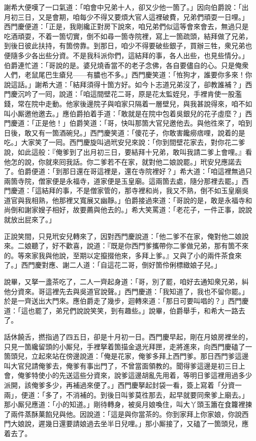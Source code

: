 謝希大便嘆了一口氣道：「咱會中兄弟十人，卻又少他一箇了。」因向伯爵說：「出月初三日，又是會期，咱每少不得又要煩大官人這裡破費，兄弟們頑耍一日哩。」西門慶便道：「正是，我剛纔正對房下說來，咱兄弟們似這等會來會去，無過只是吃酒頑耍，不着一箇切實，倒不如尋一箇寺院裡，寫上一箇疏頭，結拜做了兄弟，到後日彼此扶持，有箇傍靠。到那日，咱少不得要破些銀子，買辦三牲，衆兄弟也便隨多少各出些分資。不是我科派你們，這結拜的事，各人出些，也見些情分。」伯爵連忙道：「哥說的是。婆兒燒香當不的老子念佛，各自要儘自的心。只是俺衆人們，老鼠尾巴生瘡兒——有膿也不多。」西門慶笑道：「恠狗才，誰要你多來！你說這話。」謝希大道：「結拜須得十箇方好。如今卜志道兄弟沒了，卻教誰補？」西門慶沉吟了一囘，說道：「咱這間壁花二哥，原是花太監姪兒，手裡肯使一股濫錢，常在院中走動。他家後邊院子與咱家只隔着一層壁兒，{}與我甚說得來，咱不如叫小厮邀他邀去。」應伯爵拍着手道：「敢就是在院中包着吳銀兒的花子虛麼？」西門慶道：「正是他！」伯爵笑道：「哥，快叫那箇大官兒邀他去。{}與他徃來了，咱到日後，敢又有一箇酒碗兒。」西門慶笑道：「傻花子，你敢害饞癆痞哩，說着的是吃。」大家笑了一囘。西門慶旋叫過玳安兒來說：「你到間壁花家去，對你花二爹說，如此這般：『俺爹到了出月初三日，要結拜十兄弟，敢叫我請二爹上會哩。』看他怎的說，你就來囘我話。你二爹若不在家，就對他二娘說罷。」玳安兒應諾去了。伯爵便道：「到那日還在哥這裡是，還在寺院裡好？」希大道：「咱這裡無過只兩箇寺院，僧家便是永福寺，道家便是玉皇廟。{}這兩箇去處，隨分那裡去罷。」西門慶道：「這結拜的事，不是僧家管的，那寺裡和尚，我又不熟，倒不如玉皇廟吳道官與我相熟，他那裡又寬展又幽靜。」伯爵接過來道：「哥說的是，敢是永福寺和尚倒和謝家嫂子相好，故要薦與他去的。」希大笑罵道：「老花子，一件正事，說說就放出屁來了。」

正說笑間，只見玳安兒轉來了，因對西門慶說道：「他二爹不在家，俺對他二娘說來。二娘聽了，好不歡喜，{}說道：『既是你西門爹攜帶你二爹做兄弟，那有箇不來的。{}等來家我與他說，至期以定攛掇他來，多拜上爹。』又與了小的兩件茶食來了。」{}西門慶對應、謝二人道：「自這花二哥，倒好箇伶俐標緻娘子兒。」{}

說畢，又拏一盞茶吃了，二人一齊起身道：「哥，別了罷，咱好去通知衆兄弟，糾他分資來。哥這裡先去與吳道官說聲。」西門慶道：「我知道了，我也不留你罷。」於是一齊送出大門來。應伯爵走了幾步，迴轉來道：「那日可要叫唱的？」西門慶道：「這也罷了，弟兄們說說笑笑，到有趣些。」說畢，伯爵舉手，和希大一路去了。

話休饒舌，撚指過了四五日，卻是十月初一日。西門慶早起，剛在月娘房裡坐的，只見一箇纔留頭的小厮兒，手裡拏着箇描金退光拜匣，走將進來，向西門慶磕了一箇頭兒，立起來站在傍邊說道：「俺是花家，俺爹多拜上西門爹。那日西門爹這邊叫大官兒請俺爹去，俺爹有事出門了，不曾當面領教的。聞得爹這邊是初三日上會，俺爹特使小的先送這些分資來，說爹這邊胡亂先用着，等明日爹這裡用過多少派開，該俺爹多少，再補過來便了。」西門慶拏起封袋一看，簽上寫着「分資一兩」，便道：「多了，不消補的。到後日叫爹莫徃那去，起早就要同衆爹上廟去。」那小厮兒應道：「小的知道。」剛待轉身，被吳月娘喚住，{}叫大丫頭玉簫在食籮裡揀了兩件蒸酥菓餡兒與他。因說道：「這是與你當茶的。你到家拜上你家娘，{}你說西門大娘說，遲幾日還要請娘過去坐半日兒哩。」那小厮接了，又磕了一箇頭兒，應着去了。

